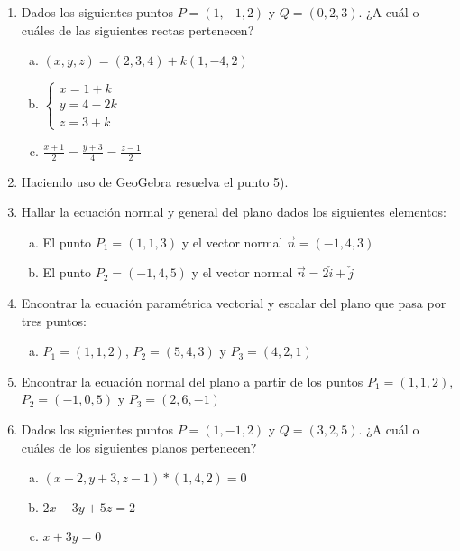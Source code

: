 \documentclass[11pt,a4paper]{article}
\begin{document}
\begin{enumerate}
\item Dados los siguientes puntos $P = (1, -1, 2)$ y $Q = (0, 2, 3)$. ¿A cu\'al o cu\'ales de las siguientes rectas pertenecen?

\begin{enumerate}[a)]
\item $(x, y, z) = (2, 3, 4) + k (1, -4, 2)$
\item $\begin{cases}
  x = 1 + k \\
  y = 4 -2 k \\
  z = 3 + k
\end{cases}$
\item $\frac{x + 1}{2} = \frac{y + 3}{4} = \frac{z - 1}{2}$
\end{enumerate}

\item Haciendo uso de GeoGebra resuelva el punto 5).

\item Hallar la ecuaci\'on normal y general del plano dados los siguientes elementos:

\begin{enumerate}[a)]
\item El punto $P_{1} = (1, 1, 3)$ y el vector normal $\vec{n} = (-1, 4, 3)$
\item El punto $P_{2} = (-1, 4, 5)$ y el vector normal $\vec{n} = 2 \check{i} + \check{j}$
\end{enumerate}

\item Encontrar la ecuaci\'on param\'etrica vectorial y escalar del plano que pasa por tres puntos:

\begin{enumerate}[a)]
\item $P_{1} = (1, 1, 2)$, $P_{2} = (5, 4, 3)$ y $P_{3} = (4, 2, 1)$
\end{enumerate}

\item Encontrar la ecuaci\'on normal del plano a partir de los puntos \linebreak $P_{1} = (1, 1, 2)$, $P_{2} = (-1, 0, 5)$ y $P_{3} = (2, 6, -1)$

\item Dados los siguientes puntos $P = (1, -1, 2)$ y $Q = (3, 2, 5)$. ¿A cu\'al o cu\'ales de los siguientes planos pertenecen? 

\begin{enumerate}[a)]
\item $(x - 2, y + 3, z - 1) * (1, 4, 2) = 0$
\item $2x - 3y + 5z = 2$
\item $x + 3y = 0$
\end{enumerate}


\end{enumerate}
\end{document}
